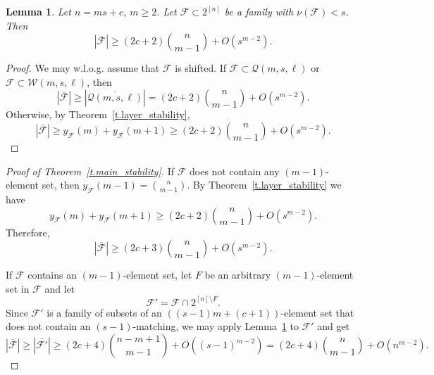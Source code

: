 \documentclass[12pt,a4paper]{article}
\newtheorem{lemma}{Lemma}
\newcommand{\m}{\mathcal}
\begin{document}
\begin{lemma} \label{l.approximate_main}
    Let $n = ms + c$, $m \geq 2$. Let $\mathcal{F} \subset 2^{[n]}$ be a family with $\nu(\mathcal{F}) < s$. Then
    \[
    |\overline{\mathcal{F}}| \geq (2c+2){n \choose m - 1} + O(s^{m - 2}).
    \]
\end{lemma}

\begin{proof}
    We may w.l.o.g. assume that $\m F$ is shifted. If $\mathcal{F} \subset \mathcal{Q}(m, s, \ell)$ or $\mathcal{F} \subset \mathcal{W}(m, s, \ell)$, then
    \[
    |\overline{\mathcal{F}}| \geq |\overline{\mathcal{Q}(m, s, \ell)}| = (2c+2){n \choose m - 1} + O(s^{m - 2}).
    \]
    Otherwise, by Theorem~\ref{t.layer_stability},
    \[
    |\overline{\mathcal{F}}| \geq y_{\mathcal{F}}(m) + y_{\mathcal{F}}(m + 1) \geq (2c+2){n \choose m - 1} + O(s^{m - 2}).
    \]
\end{proof}

\begin{proof}[Proof of Theorem~\ref{t.main_stability}]
    If $\mathcal{F}$ does not contain any $(m-1)$-element set, then $y_{\mathcal{F}}(m-1) = {n \choose m - 1}$. By Theorem~\ref{t.layer_stability} we have
    \[
    y_{\mathcal{F}}(m) + y_{\mathcal{F}}(m + 1) \geq (2c+2){n \choose m - 1} + O(s^{m - 2}).
    \]
    Therefore,
    \[
    |\overline{\mathcal{F}}| \geq (2c+3){n \choose m - 1} + O(s^{m - 2}).
    \]

    If $\mathcal{F}$ contains an $(m-1)$-element set, let $F$ be an arbitrary $(m-1)$-element set in $\mathcal{F}$ and let
    \[
    \mathcal{F}' = \mathcal{F} \cap 2^{[n]\setminus F}.
    \]
    Since $\mathcal{F}'$ is a  family of subsets of an $((s-1)m+(c+1))$-element set that does not contain an $(s-1)$-matching, we may apply Lemma~\ref{l.approximate_main} to $\mathcal{F}'$ and get
    \[
    |\overline{\mathcal{F}}| \geq |\overline{\mathcal{F}'}| \geq (2c+4){n - m + 1 \choose m - 1} + O((s-1)^{m - 2}) = (2c+4){n \choose m - 1} + O(n^{m - 2}).
    \]
\end{proof}
\end{document}
